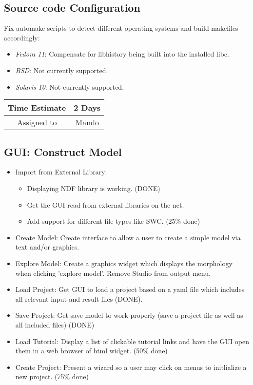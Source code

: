 \documentclass[12pt]{article}
\begin{document}
\subsection{Source code Configuration}

Fix automake scripts to detect different operating systems 
and build makefiles accordingly:


\begin{itemize}
\item {\it Fedora 11}: Compensate for libhistory being built into the
  installed libc.
\item {\it BSD}: Not currently supported.
\item {\it Solaris 10}: Not currently supported.
\end{itemize}

\begin{center}
  \vspace{5mm}
  \centering
  \begin{tabular}{|c|c|}
    \hline
    Time Estimate
    & 2 Days\\
    \hline
    Assigned to
    & Mando \\
    \hline
  \end{tabular}
\end{center}


\subsection{GUI: Construct Model}

\begin{itemize}
\item Import from External Library:
  \begin{itemize}
  \item Displaying NDF library is working. (DONE)
  \item Get the GUI read from external libraries on the net.
  \item Add support for different file types like SWC. (25\% done)
  \end{itemize}
\item Create Model: Create interface to allow a user to create a
  simple model via text and/or graphics.
\item Explore Model: Create a graphics widget which displays the
  morphology when clicking 'explore model'.  Remove Studio from output
  menu.
\item Load Project: Get GUI to load a project based on a yaml file
  which includes all relevant input and result files (DONE).
\item Save Project: Get save model to work properly (save a project
  file as well as all included files) (DONE)
\item Load Tutorial: Display a list of clickable tutorial links and
  have the GUI open them in a web browser of html widget. (50\% done)
\item Create Project: Present a wizard so a user may click on menus
  to initlialize a new project. (75\% done)
\end{itemize}
\end{document}
